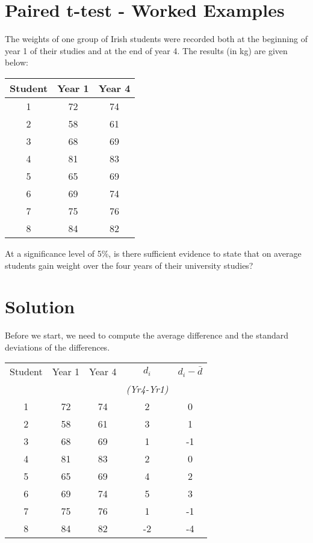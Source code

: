 \documentclass[a4paper,12pt]{article}
\begin{document}
\section*{Paired t-test - Worked Examples}

The weights of one group of Irish students were recorded both at the beginning of year 1 of their studies and at the end of year 4.
The results (in kg) are given below:

\begin{center}
	\begin{tabular}{|c|c|c|} \hline 
		Student	&	Year 1	&	Year 4	\\ \hline \hline
		1	&	72	&	74	\\ \hline
		2	&	58	&	61	\\ \hline
		3	&	68	&	69	\\ \hline
		4	&	81	&	83	\\ \hline
		5	&	65	&	69	\\ \hline
		6	&	69	&	74	\\ \hline
		7	&	75	&	76	\\ \hline
		8	&	84	&	82	\\ \hline
	\end{tabular} 
\end{center}

\noindent 
At a significance level of 5\%, is there sufficient evidence to state that on average students gain weight over the four years of their university studies?

\section*{Solution}

Before we start, we need to compute the average difference and the standard deviations of the differences. 

\begin{center}
	\begin{tabular}{|c|c|c|c|c|} \hline
		Student	&	Year 1	&	Year 4	&	$d_i$ 	&	$d_i - \bar{d}$ \\ &&&\textit{(Yr4-Yr1)}&	\\ \hline
		1	&	72	&	74	&	2	&	0	\\ \hline
		2	&	58	&	61	&	3	&	1	\\ \hline
		3	&	68	&	69	&	1	&	-1	\\ \hline
		4	&	81	&	83	&	2	&	0	\\ \hline
		5	&	65	&	69	&	4	&	2	\\ \hline
		6	&	69	&	74	&	5	&	3	\\ \hline
		7	&	75	&	76	&	1	&	-1	\\ \hline
		8	&	84	&	82	&	-2	&	-4	\\ \hline
	\end{tabular} 
\end{center}	
\end{document}
